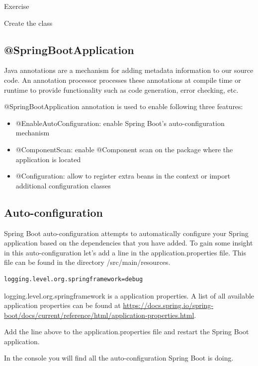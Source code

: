 Exercise

Create the class 





\subsection{@SpringBootApplication}

Java annotations are a mechanism for adding metadata information to our source code. An annotation processor processes these annotations at compile time or runtime to provide functionality such as code generation, error checking, etc.

@SpringBootApplication annotation is used to enable following three features:
\begin{itemize}
\item @EnableAutoConfiguration: enable Spring Boot’s auto-configuration mechanism
\item @ComponentScan: enable @Component scan on the package where the application is located
\item @Configuration: allow to register extra beans in the context or import additional configuration classes
\end{itemize}


\subsection{Auto-configuration}

Spring Boot auto-configuration attempts to automatically configure your Spring application based on the dependencies that you have added.
To gain some insight in this auto-configuration let's add a line in the application.properties file. This file can be found in the directory /src/main/resources. 

\begin{lstlisting}
logging.level.org.springframework=debug
\end{lstlisting}

logging.level.org.springframework is a application properties. A list of all available application properties can be found at \url{https://docs.spring.io/spring-boot/docs/current/reference/html/application-properties.html}.

\begin{oefening}
Add the line above to the application.properties file and restart the Spring Boot application.
\end{oefening}

In the console you will find all the auto-configuration Spring Boot is doing.